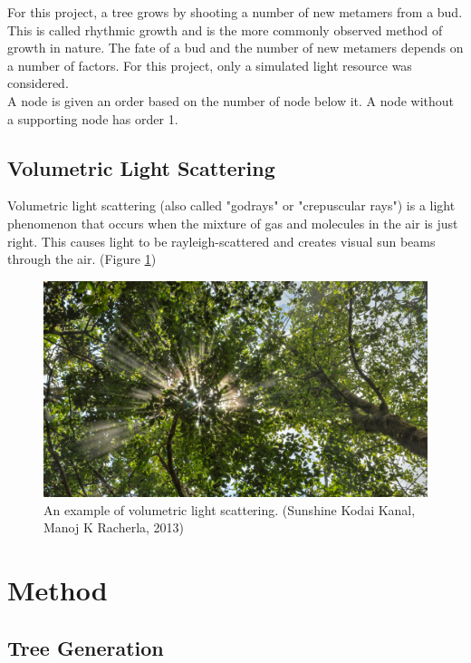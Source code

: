 \documentclass{article}
\begin{document}
  			For this project, a tree grows by shooting a number of new metamers from a bud. This is called rhythmic growth and is the more commonly observed method of growth in nature. \citep{barthelemy2007plant} The fate of a bud and the number of new metamers depends on a number of factors. For this project, only a simulated light resource was considered.\\
  			
  			A node is given an order based on the number of node below it. A node without a supporting node has order 1.
  		\subsection{Volumetric Light Scattering}
  			Volumetric light scattering (also called "godrays" or "crepuscular rays") is a light phenomenon that occurs when the mixture of gas and molecules in the air is just right. This causes light to be rayleigh-scattered and creates visual sun beams through the air. (Figure \ref{fig:godrayexample})
  			
  			\begin{figure}[h!]
  				\centering
  				\includegraphics[scale=0.7]{godrays_example}
  				\caption{An example of volumetric light scattering. (Sunshine Kodai Kanal, Manoj K Racherla, 2013)}
  				\label{fig:godrayexample}
  			\end{figure}
  			
  		
  			
  	\section{Method}
  		\subsection{Tree Generation}
  			
\end{document}
